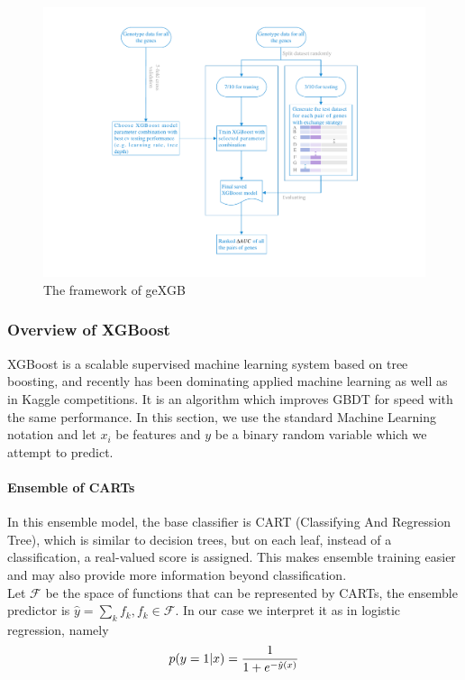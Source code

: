 \documentclass[11pt]{article}
\theoremstyle{plain}
\theoremstyle{definition}
\theoremstyle{remark}
\begin{document}
\begin{figure}[H]
    \begin{center}
       \includegraphics[scale=0.6]{framework_0116.pdf}
    \end{center}
\caption{\label{det}The framework of geXGB}
\end{figure}

\subsubsection{Overview of XGBoost}

XGBoost \cite{9} is a scalable supervised machine learning system based on tree boosting, and recently has been dominating applied machine learning as well as in Kaggle competitions. It is an algorithm which improves GBDT for speed with the same performance. In this section, we use the standard Machine Learning notation and let $x_i$ be features and $y$ be a binary random variable which we attempt to predict.

\paragraph{Ensemble of CARTs}
In this ensemble model, the base classifier is CART (Classifying And Regression Tree), which is similar to decision trees, but on each leaf, instead of a classification, a real-valued score is assigned. This makes ensemble training easier and may also provide more information beyond classification.\\

\noindent Let $\mathcal{F}$ be the space of functions that can be represented by CARTs, the ensemble predictor is $\hat{y}=\sum_k f_k, f_k\in\mathcal{F}$. In our case we interpret it as in logistic regression, namely
\begin{equation}
p(y=1|x)={1\over 1+e^{-\hat{y}(x)}}
\end{equation}
\end{document}

